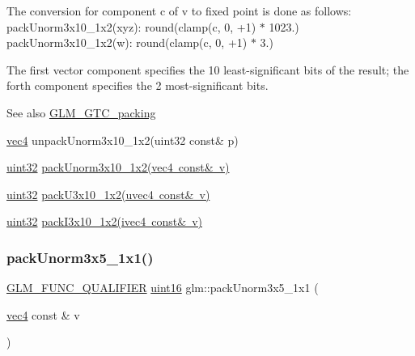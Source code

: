 The conversion for component c of v to fixed point is done as follows\+: pack\+Unorm3x10\+\_\+1x2(xyz)\+: round(clamp(c, 0, +1) $\ast$ 1023.) pack\+Unorm3x10\+\_\+1x2(w)\+: round(clamp(c, 0, +1) $\ast$ 3.)

The first vector component specifies the 10 least-\/significant bits of the result; the forth component specifies the 2 most-\/significant bits.

\begin{DoxySeeAlso}{See also}
\mbox{\hyperlink{group__gtc__packing}{G\+L\+M\+\_\+\+G\+T\+C\+\_\+packing}} 

\mbox{\hyperlink{group__core__types_ga5881b1b022d7fd1b7218f5916532dd02}{vec4}} unpack\+Unorm3x10\+\_\+1x2(uint32 const\& p) 

\mbox{\hyperlink{group__gtc__type__precision_ga202b6a53c105fcb7e531f9b443518451}{uint32}} \mbox{\hyperlink{group__gtc__packing_ga2cf2d11b40bd48639110456fd74c2e33}{pack\+Unorm3x10\+\_\+1x2(vec4 const\& v)}} 

\mbox{\hyperlink{group__gtc__type__precision_ga202b6a53c105fcb7e531f9b443518451}{uint32}} \mbox{\hyperlink{group__gtc__packing_gaf656d8862628f96b20de7a36eaa1fe56}{pack\+U3x10\+\_\+1x2(uvec4 const\& v)}} 

\mbox{\hyperlink{group__gtc__type__precision_ga202b6a53c105fcb7e531f9b443518451}{uint32}} \mbox{\hyperlink{group__gtc__packing_ga032e18fa5bc5b8f3897104aeb2f1e195}{pack\+I3x10\+\_\+1x2(ivec4 const\& v)}} 
\end{DoxySeeAlso}
\mbox{\label{group__gtc__packing_ga1b41375846ed66768da78ca299d8d010}} 
\subsubsection{\texorpdfstring{pack\+Unorm3x5\+\_\+1x1()}{packUnorm3x5\_1x1()}}
{\footnotesize\ttfamily \mbox{\hyperlink{setup_8hpp_a33fdea6f91c5f834105f7415e2a64407}{G\+L\+M\+\_\+\+F\+U\+N\+C\+\_\+\+Q\+U\+A\+L\+I\+F\+I\+ER}} \mbox{\hyperlink{group__gtc__type__precision_gad8c2939e1fdd8e5828b31d95c52255d5}{uint16}} glm\+::pack\+Unorm3x5\+\_\+1x1 (\begin{DoxyParamCaption}\item[{\mbox{\hyperlink{group__core__types_ga5881b1b022d7fd1b7218f5916532dd02}{vec4}} const \&}]{v }\end{DoxyParamCaption})}

